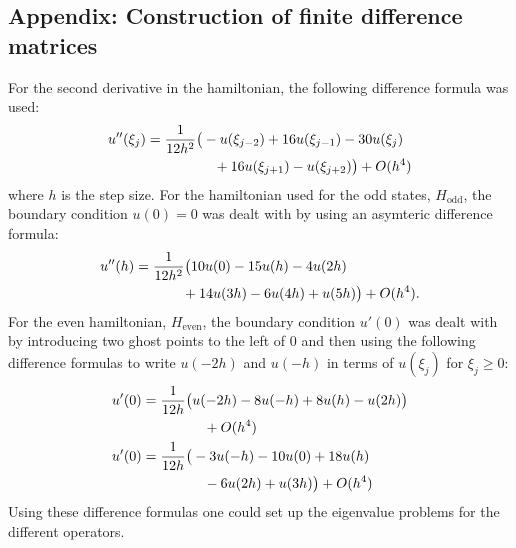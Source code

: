 \documentclass[twocolumn]{article}
\begin{document}
\begin{large}
\subsection*{Appendix: Construction of finite difference matrices}
For the second derivative in the hamiltonian, the following difference formula was used:
\begin{equation}
    \begin{split}
        u''(\xi_j) &= \frac{1}{12h^2}\big(-u(\xi_{j-2})+16u(\xi_{j-1})-30u(\xi_j) \\ 
        &\hspace{1.7cm}+16u(\xi_{j+1})-u(\xi_{j+2})\big) + O(h^4)
    \end{split}
\end{equation}
where $h$ is the step size.
For the hamiltonian used for the odd states, $H_\text{odd}$, the boundary condition $u(0)=0$ was dealt with by using an asymteric difference formula:
\begin{equation}
    \begin{split}
    u''(h) &= \frac{1}{12h^2}\big(10u(0)-15u(h)-4u(2h) \\
    &\hspace{1.2cm} +14u(3h)-6u(4h)+u(5h)\big) + O(h^4).
    \end{split}
\end{equation}
For the even hamiltonian, $H_\text{even}$, the boundary condition $u'(0)$ was dealt with by introducing two ghost points to the left of $0$ and then using the following difference formulas to write $u(-2h)$ and $u(-h)$ in terms of $u(\xi_j)$ for $\xi_j\geq 0$:
\begin{equation}
    \begin{split}
        &u'(0) = \frac{1}{12h}\big(u(-2h)-8u(-h)+8u(h)-u(2h)\big) \\ 
        &\hspace{2.3cm} +O(h^4) \\ 
        &u'(0) = \frac{1}{12h}\big(-3u(-h)-10u(0)+18u(h) \\ 
        &\hspace{2.3cm} -6u(2h)+u(3h)\big)+O(h^4)
    \end{split}
\end{equation}
Using these difference formulas one could set up the eigenvalue problems for the different operators. 
\end{large}
\end{document}
